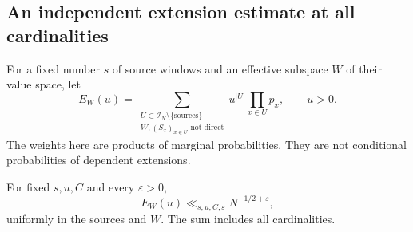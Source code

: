 \subsection{An independent extension estimate at all cardinalities}

For a fixed number $s$ of source windows and an effective subspace $W$
of their value space, let
\[
 E_W(u)=\sum_{\substack{U\subset\mathcal I_N\setminus\{\text{sources}\}\\
                      W,(S_x)_{x\in U}\text{ not direct}}}
                 u^{|U|}\prod_{x\in U}p_x,
 \qquad u>0.
\]
The weights here are products of marginal probabilities. They are not
conditional probabilities of dependent extensions.

\begin{lemma}
\label{p13:transfer:independent-deficit}
For fixed $s,u,C$ and every $\varepsilon>0$,
\begin{equation}
 E_W(u)\ll_{s,u,C,\varepsilon}N^{-1/2+\varepsilon},
 \label{p13:transfer:independent-bound}
\end{equation}
uniformly in the sources and $W$. The sum includes all cardinalities.
\end{lemma}

